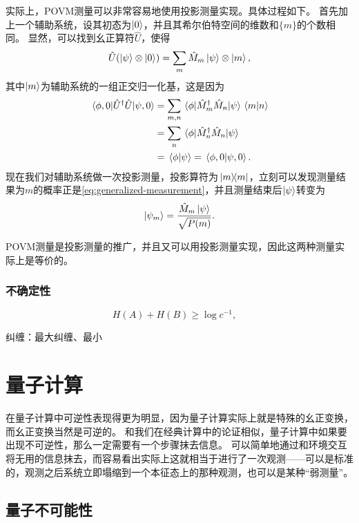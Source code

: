 \documentclass[UTF8, a4paper]{ctexart}
\begin{document}
实际上，POVM测量可以非常容易地使用投影测量实现。具体过程如下。
首先加上一个辅助系统，设其初态为$\ket{0}$，并且其希尔伯特空间的维数和$\{m\}$的个数相同。
显然，可以找到幺正算符$\hat{U}$，使得
\begin{equation}
    \hat{U} (\ket{\psi} \otimes \ket{0}) = \sum_m \hat{M}_m \ket{\psi} \otimes \ket{m},
\end{equation}
其中$\ket{m}$为辅助系统的一组正交归一化基，这是因为
\[
    \begin{aligned}
        \mel*{\phi, 0}{\hat{U}^\dagger \hat{U}}{\psi, 0} &= \sum_{m, n} \mel*{\phi}{\hat{M}^\dagger_m \hat{M}_n}{\psi} \braket*{m}{n} \\
        &= \sum_n \mel*{\phi}{\hat{M}^\dagger_n \hat{M}_n}{\psi} \\
        &= \braket*{\phi}{\psi} = \braket*{\phi, 0}{\psi, 0}.
    \end{aligned}
\]
现在我们对辅助系统做一次投影测量，投影算符为$\dyad*{m}{m}$，立刻可以发现测量结果为$m$的概率正是\eqref{eq:generalized-measurement}，并且测量结束后$\ket{\psi}$转变为
\begin{equation}
    \ket{\psi_m} = \frac{\hat{M}_m \ket{\psi}}{\sqrt{P(m)}}.
\end{equation}

POVM测量是投影测量的推广，并且又可以用投影测量实现，因此这两种测量实际上是等价的。

\subsubsection{不确定性}

\begin{equation}
    H(A) + H(B) \geq \log c^{-1}, \quad 
\end{equation}

纠缠：最大纠缠、最小

\section{量子计算}

在量子计算中可逆性表现得更为明显，因为量子计算实际上就是特殊的幺正变换，而幺正变换当然是可逆的。
和我们在经典计算中的论证相似，量子计算中如果要出现不可逆性，那么一定需要有一个步骤抹去信息。
可以简单地通过和环境交互将无用的信息抹去，而容易看出实际上这就相当于进行了一次观测——可以是标准的，观测之后系统立即塌缩到一个本征态上的那种观测，也可以是某种“弱测量”。

\subsection{量子不可能性}
\end{document}
